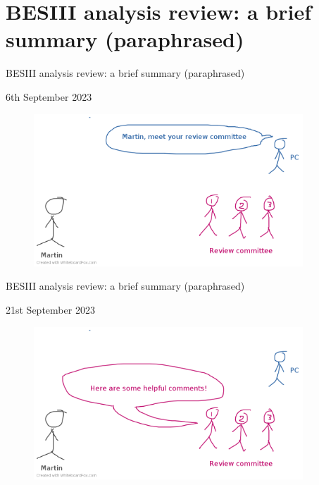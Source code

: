 \documentclass{beamer}
\begin{document}
\section{BESIII analysis review: a brief summary (paraphrased)}

\begin{frame}{BESIII analysis review: a brief summary (paraphrased)}
  \begin{center}
    {\large 6th September 2023}
  \end{center}
  \begin{figure}
    \includegraphics[width=0.9\textwidth,trim={0 0 0 0.5cm},clip=true]{Plots/BESIII_review_process_1.png}
  \end{figure}
\end{frame}

\begin{frame}{BESIII analysis review: a brief summary (paraphrased)}
  \begin{center}
    {\large 21st September 2023}
  \end{center}
  \begin{figure}
    \includegraphics[width=0.9\textwidth,trim={0 0 0 0.5cm},clip=true]{Plots/BESIII_review_process_2.png}
  \end{figure}
\end{frame}
\end{document}
